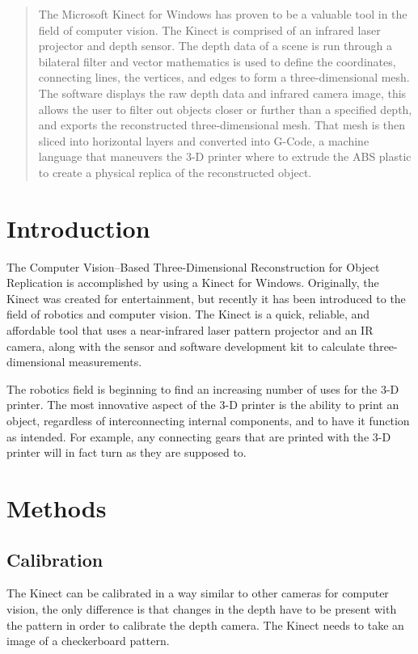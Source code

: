 \documentclass[pdftex,10.5pt]{report}
\begin{document}


\begin{abstract}
The Microsoft Kinect for Windows has proven to be a valuable tool in the field of computer vision. The Kinect is comprised of an infrared laser projector and depth sensor. The depth data of a scene is run through a bilateral filter and vector mathematics is used to define the coordinates, connecting lines, the vertices, and edges to form a three-dimensional mesh. The software displays the raw depth data and infrared camera image, this allows the user to filter out objects closer or further than a specified depth, and exports the reconstructed three-dimensional mesh. That mesh is then sliced into horizontal layers and converted into G-Code, a machine language that maneuvers the 3-D printer where to extrude the ABS plastic to create a physical replica of the reconstructed object. 
\end{abstract}

\tableofcontents

\section{Introduction}
The Computer Vision--Based Three-Dimensional Reconstruction for Object Replication is accomplished by using a Kinect for Windows. Originally, the Kinect was created for entertainment, but recently it has been introduced to the field of robotics and computer vision. The Kinect is a quick, reliable, and affordable tool that uses a near-infrared laser pattern projector and an IR camera, along with the sensor and software development kit to calculate three-dimensional measurements.

The robotics field is beginning to find an increasing number of uses for the 3-D printer. The most innovative aspect of the 3-D printer is the ability to print an object, regardless of interconnecting internal components, and to have it function as intended. For example, any connecting gears that are printed with the 3-D printer will in fact turn as they are supposed to.

\section{Methods}
\subsection{Calibration}
The Kinect can be calibrated in a way similar to other cameras for computer vision, the only difference is that changes in the depth have to be present  with the pattern in order to calibrate the depth camera. The Kinect needs to take an image of a checkerboard pattern.
\end{document}
